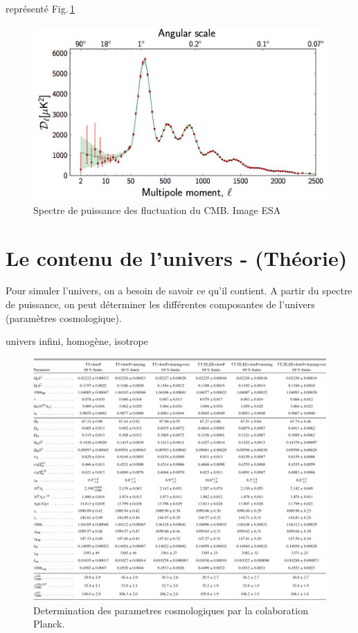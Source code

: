 représenté Fig.\,\ref{fig:cmb_power_spectrum}

\begin{figure}[bth]
        \includegraphics[width=.95\linewidth]{img/01/CMB_power_spectrum.png} 
        \caption{Spectre de puissance des fluctuation du CMB.
        Image ESA}
 		\label{fig:cmb_power_spectrum}
\end{figure}


\section{Le contenu de l'univers - (Théorie)}

Pour simuler l'univers, on a besoin de savoir ce qu'il contient. 
A partir du spectre de puissance, on peut déterminer les différentes composantes de l'univers (paramètres cosmologique).

univers infini, homogène, isotrope




\begin{figure}[bth]
        \includegraphics[width=.95\linewidth]{img/01/table_planck.pdf} 
        \caption{Determination des parametres cosmologiques par la colaboration Planck.}
 		\label{fig:planck_parameters}
\end{figure}

